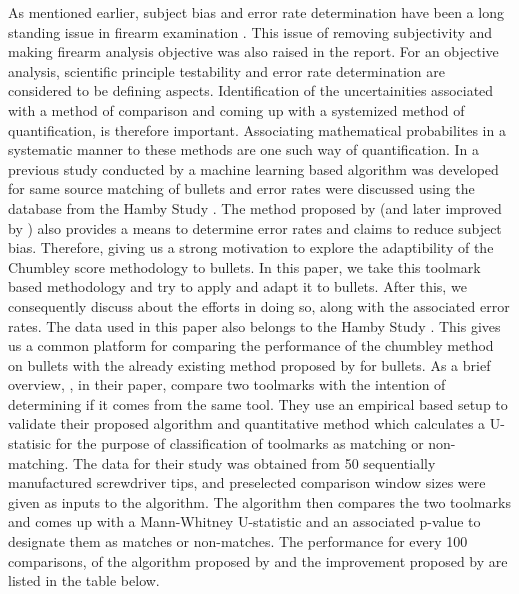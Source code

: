 \documentclass[12pt]{article}
\begin{document}
As mentioned earlier, subject bias and error rate determination have
been a long standing issue in firearm examination \citep{NAS:2009}. This
issue of removing subjectivity and making firearm analysis objective was
also raised in the \citet{pcast2016} report. For an objective analysis,
scientific principle testability and error rate determination are
considered to be defining aspects. Identification of the uncertainities
associated with a method of comparison and coming up with a systemized
method of quantification, is therefore important. Associating
mathematical probabilites in a systematic manner to these methods are
one such way of quantification. In a previous study conducted by
\citet{aoas} a machine learning based algorithm was developed for same
source matching of bullets and error rates were discussed using the
database from the Hamby Study \citep{hamby}. The method proposed by
\citet{chumbley} (and later improved by \citet{hadler}) also provides a
means to determine error rates and claims to reduce subject bias.
Therefore, giving us a strong motivation to explore the adaptibility of
the Chumbley score methodology to bullets. In this paper, we take this
toolmark based methodology and try to apply and adapt it to bullets.
After this, we consequently discuss about the efforts in doing so, along
with the associated error rates. The data used in this paper also
belongs to the Hamby Study \citep{hamby}. This gives us a common
platform for comparing the performance of the chumbley method on bullets
with the already existing method proposed by \citet{aoas} for bullets.
As a brief overview, \citet{chumbley}, in their paper, compare two
toolmarks with the intention of determining if it comes from the same
tool. They use an empirical based setup to validate their proposed
algorithm and quantitative method which calculates a U-statisic for the
purpose of classification of toolmarks as matching or non-matching. The
data for their study was obtained from 50 sequentially manufactured
screwdriver tips, and preselected comparison window sizes were given as
inputs to the algorithm. The algorithm then compares the two toolmarks
and comes up with a Mann-Whitney U-statistic and an associated p-value
to designate them as matches or non-matches. The performance for every
100 comparisons, of the algorithm proposed by \citet{chumbley} and the
improvement proposed by \citet{hadler} are listed in the table below.
\end{document}
